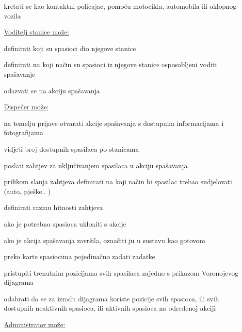 \begin{packed_enum}
				\begin{packed_enum}
					
					\item kretati se kao kontaktni policajac, pomoću motocikla, automobila ili oklopnog vozila
					
				\end{packed_enum}
				
				\item \underline{Voditelj stanice može:}
				
				\begin{packed_enum}
					
					\item definirati koji su spasioci dio njegove stanice
					\item definirati na koji način su spasioci iz njegove stanice osposobljeni voditi spašavanje
					\item odazvati se na akciju spašavanja
					
				\end{packed_enum}
				\item \underline{Dispečer može:}
				
				\begin{packed_enum}
					
					\item na temelju prijave otvarati akcije spašavanja s dostupnim informacijama i fotografijama
					\item vidjeti broj dostupnih spasilaca po stanicama
					\item poslati zahtjev za uključivanjem spasilaca u akciju spašavanja
					\item prilikom slanja zahtjeva definirati na koji način bi spasilac trebao sudjelovati (auto, pješke.. )
					\item definirati razinu hitnosti zahtjeva
					\item ako je potrebno spasioca ukloniti s akcije
					\item ako je akcija spašavanja završila, označiti ju u sustavu kao gotovom
					\item preko karte spasiocima pojedinačno zadati zadatke
					\item pristupiti trenutnim pozicijama svih spasilaca zajedno s prikazom Voronojevog dijagrama
					\item odabrati da se za izradu dijagrama koriste pozicije svih spasioca, ili svih dostupnih neaktivnih spasioca, ili aktivnih spasioca na određenoj akciji
					
				\end{packed_enum}
				\item \underline{Administrator može:}
				

\end{packed_enum}
